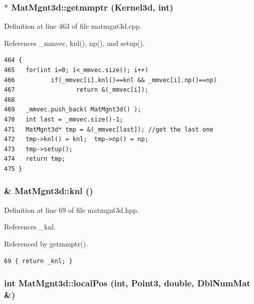 \subsubsection{ $\ast$ Mat\-Mgnt3d::getmmptr ({\bf Kernel3d}, int)\hspace{0.3cm}{\tt  [static]}}\label{classMatMgnt3d_79ba0648e2167456e6cd634d046ab0d6_79ba0648e2167456e6cd634d046ab0d6}




Definition at line 463 of file matmgnt3d.cpp.

References \_\-mmvec, knl(), np(), and setup().

\footnotesize\begin{verbatim}464 {
465   for(int i=0; i<_mmvec.size(); i++)
466          if(_mmvec[i].knl()==knl && _mmvec[i].np()==np)
467                 return &(_mmvec[i]);
468   
469   _mmvec.push_back( MatMgnt3d() );
470   int last = _mmvec.size()-1;
471   MatMgnt3d* tmp = &(_mmvec[last]); //get the last one
472   tmp->knl() = knl;  tmp->np() = np;
473   tmp->setup();
474   return tmp;
475 }
\end{verbatim}\normalsize 


\subsubsection{\& Mat\-Mgnt3d::knl ()\hspace{0.3cm}{\tt  [inline]}}\label{classMatMgnt3d_d01911fc223ab4bc9604db12f942194e_d01911fc223ab4bc9604db12f942194e}




Definition at line 69 of file matmgnt3d.hpp.

References \_\-knl.

Referenced by getmmptr().

\footnotesize\begin{verbatim}69 { return _knl; }
\end{verbatim}\normalsize 


\subsubsection{\setlength{\rightskip}{0pt plus 5cm}int Mat\-Mgnt3d::local\-Pos (int, Point3, double, Dbl\-Num\-Mat \&)}\label{classMatMgnt3d_8b933eb3b49b51a202cfc077e84dca67_8b933eb3b49b51a202cfc077e84dca67}


